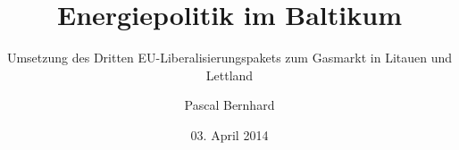 \documentclass{scrreprt}
\begin{document}
\titlehead{Freie Universität Berlin \\
Fachbereich Politikwissenschaft}
\subject{Diplomarbeit im Studiengang Politik}
\title{Energiepolitik im Baltikum}
\subtitle{Umsetzung des Dritten EU-Liberalisierungspakets zum Gasmarkt in Litauen und Lettland}
\author{Pascal Bernhard}
\date{03. April 2014}
\publishers{Betreut und herausgegeben von Prof. Dr. rer. LaTeX}
\uppertitleback{Obiger Titelrückentitel}
\lowertitleback{Für dieses Beispiel wird keine Haftung übernommen.}
\dedication{Diese Diplomarbeit widme ich
\\Frau Andrea Volmary und Herrn Kai-Uwe Christoph \\
ohne ihre Unterstützung hätte ich diese Diplomarbeit nicht schreiben können}
\maketitle
 
\end{document}
